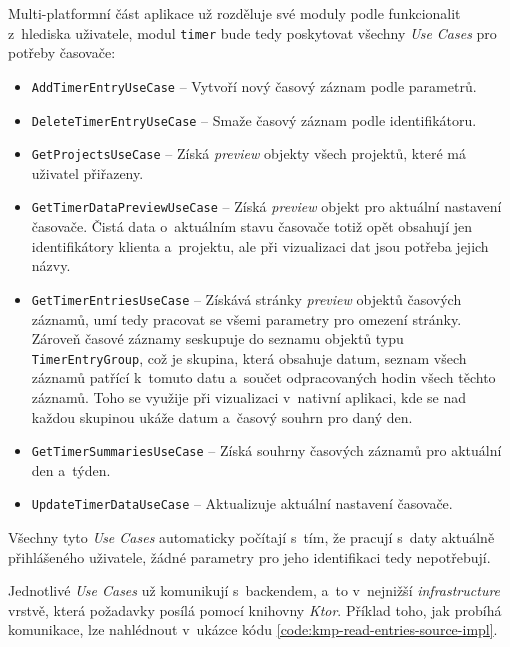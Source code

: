 Multi-platformní část aplikace už rozděluje své moduly podle funkcionalit z~hlediska uživatele, modul \texttt{timer} bude tedy poskytovat všechny \emph{Use Cases} pro potřeby časovače:
\begin{itemize}
\item\texttt{AddTimerEntryUseCase} – Vytvoří nový časový záznam podle parametrů.
\item\texttt{DeleteTimerEntryUseCase} – Smaže časový záznam podle identifikátoru.
\item\texttt{GetProjectsUseCase} – Získá \emph{preview} objekty všech projektů, které má uživatel přiřazeny.
\item\texttt{GetTimerDataPreviewUseCase} – Získá \emph{preview} objekt pro aktuální nastavení časovače. Čistá data o~aktuálním stavu časovače totiž opět obsahují jen identifikátory klienta a~projektu, ale při vizualizaci dat jsou potřeba jejich názvy.
\item\texttt{GetTimerEntriesUseCase} – Získává stránky \emph{preview} objektů časových záznamů, umí tedy pracovat se všemi parametry pro omezení stránky. Zároveň časové záznamy seskupuje do seznamu objektů typu \texttt{TimerEntryGroup}, což je skupina, která obsahuje datum, seznam všech záznamů patřící k~tomuto datu a~součet odpracovaných hodin všech těchto záznamů. Toho se využije při vizualizaci v~nativní aplikaci, kde se nad každou skupinou ukáže datum a~časový souhrn pro daný den.
\item\texttt{GetTimerSummariesUseCase} – Získá souhrny časových záznamů pro aktuální den a~týden.
\item\texttt{UpdateTimerDataUseCase} – Aktualizuje aktuální nastavení časovače.
\end{itemize}

Všechny tyto \emph{Use Cases} automaticky počítají s~tím, že pracují s~daty aktuálně přihlášeného uživatele, žádné parametry pro jeho identifikaci tedy nepotřebují.

Jednotlivé \emph{Use Cases} už komunikují s~backendem, a~to v~nejnižší \emph{infrastructure} vrstvě, která požadavky posílá pomocí knihovny \emph{Ktor}. Příklad toho, jak probíhá komunikace, lze nahlédnout v~ukázce kódu \ref{code:kmp-read-entries-source-impl}.

